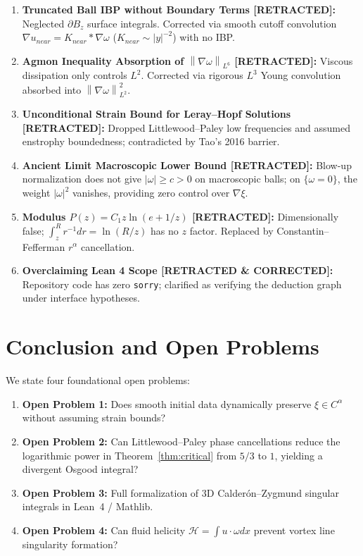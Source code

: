 \documentclass[11pt,reqno]{amsart}
\numberwithin{equation}{section}
\theoremstyle{definition}
\newcommand{\norm}[1]{\left\lVert#1\right\rVert}
\begin{document}
\begin{enumerate}
\item \textbf{Truncated Ball IBP without Boundary Terms [RETRACTED]:} Neglected $\partial B_z$ surface integrals. Corrected via smooth cutoff convolution $\nabla u_{near} = K_{near} * \nabla \omega$ ($K_{near} \sim |y|^{-2}$) with no IBP.
\item \textbf{Agmon Inequality Absorption of $\norm{\nabla \omega}_{L^6}$ [RETRACTED]:} Viscous dissipation only controls $L^2$. Corrected via rigorous $L^3$ Young convolution absorbed into $\norm{\nabla \omega}_{L^2}^2$.
\item \textbf{Unconditional Strain Bound for Leray--Hopf Solutions [RETRACTED]:} Dropped Littlewood--Paley low frequencies and assumed enstrophy boundedness; contradicted by Tao's 2016 barrier.
\item \textbf{Ancient Limit Macroscopic Lower Bound [RETRACTED]:} Blow-up normalization does not give $|\omega| \ge c > 0$ on macroscopic balls; on $\{\omega = 0\}$, the weight $|\omega|^2$ vanishes, providing zero control over $\nabla \xi$.
\item \textbf{Modulus $P(z) = C_1 z \ln(e + 1/z)$ [RETRACTED]:} Dimensionally false; $\int_z^R r^{-1} dr = \ln(R/z)$ has no $z$ factor. Replaced by Constantin--Fefferman $r^\alpha$ cancellation.
\item \textbf{Overclaiming Lean 4 Scope [RETRACTED \& CORRECTED]:} Repository code has zero \texttt{sorry}; clarified as verifying the deduction graph under interface hypotheses.
\end{enumerate}

\section{Conclusion and Open Problems}

We state four foundational open problems:
\begin{enumerate}
\item \textbf{Open Problem 1:} Does smooth initial data dynamically preserve $\xi \in C^\alpha$ without assuming strain bounds?
\item \textbf{Open Problem 2:} Can Littlewood--Paley phase cancellations reduce the logarithmic power in Theorem~\ref{thm:critical} from $5/3$ to $1$, yielding a divergent Osgood integral?
\item \textbf{Open Problem 3:} Full formalization of 3D Calder\'on--Zygmund singular integrals in Lean~4 / Mathlib.
\item \textbf{Open Problem 4:} Can fluid helicity $\mathcal{H} = \int u \cdot \omega dx$ prevent vortex line singularity formation?
\end{enumerate}
\end{document}
